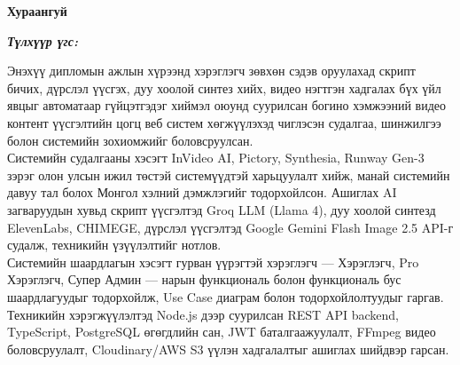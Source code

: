 

\begin{center}
{\scshape\Large \univname\par}
{\scshape\large \facname\par}\vspace{0.5cm}
{\huge\textbf{{Хураангуй}} \par}
\bigskip
{\Large{\ttitle} \par}
\bigskip
{\normalsize \shortname \par}
\addressname
\end{center}

\textit{\textbf{Түлхүүр үгс: \keywordnames}}
\bigskip

Энэхүү дипломын ажлын хүрээнд хэрэглэгч зөвхөн сэдэв оруулахад скрипт бичих, дүрслэл үүсгэх, дуу хоолой синтез хийх, видео нэгтгэн хадгалах бүх үйл явцыг автоматаар гүйцэтгэдэг хиймэл оюунд суурилсан богино хэмжээний видео контент үүсгэлтийн цогц веб систем хөгжүүлэхэд чиглэсэн судалгаа, шинжилгээ болон системийн зохиомжийг боловсруулсан. \\

Системийн судалгааны хэсэгт InVideo AI, Pictory, Synthesia, Runway Gen-3 зэрэг олон улсын ижил төстэй системүүдтэй харьцуулалт хийж, манай системийн давуу тал болох Монгол хэлний дэмжлэгийг тодорхойлсон. Ашиглах AI загваруудын хувьд скрипт үүсгэлтэд Groq LLM (Llama 4), дуу хоолой синтезд ElevenLabs, CHIMEGE, дүрслэл үүсгэлтэд Google Gemini Flash Image 2.5 API-г судалж, техникийн үзүүлэлтийг нотлов. \\

Системийн шаардлагын хэсэгт гурван үүрэгтэй хэрэглэгч --- Хэрэглэгч, Pro Хэрэглэгч, Супер Админ --- нарын функциональ болон функциональ бус шаардлагуудыг тодорхойлж, Use Case диаграм болон тодорхойлолтуудыг гаргав. Техникийн хэрэгжүүлэлтэд Node.js дээр суурилсан REST API backend, TypeScript, PostgreSQL өгөгдлийн сан, JWT баталгаажуулалт, FFmpeg видео боловсруулалт, Cloudinary/AWS S3 үүлэн хадгалалтыг ашиглах шийдвэр гарсан.

